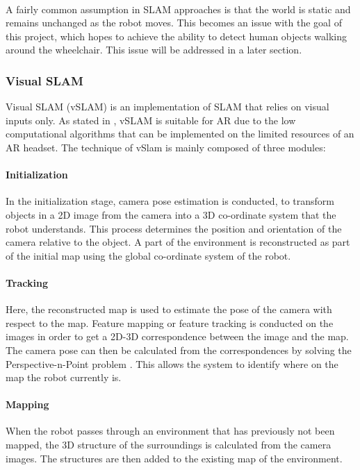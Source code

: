 \paragraph{}A fairly common assumption in SLAM approaches is that the world is static and remains unchanged as the robot moves. This becomes an issue with the goal of this project, which hopes to achieve the ability to detect human objects walking around the wheelchair. This issue will be addressed in a later section.

\subsubsection{Visual SLAM}
Visual SLAM (vSLAM) is an implementation of SLAM that relies on visual inputs only. As stated in \cite{Taketomi2017}, vSLAM is suitable for AR due to the low computational algorithms that can be implemented on the limited resources of an AR headset. The technique of vSlam is mainly composed of three modules:

\paragraph{Initialization}
In the initialization stage, camera pose estimation is conducted, to transform objects in a 2D image from the camera into a 3D co-ordinate system that the robot understands. This process determines the position and orientation of the camera relative to the object. A part of the environment is reconstructed as part of the initial map using the global co-ordinate system of the robot.

\paragraph{Tracking}
Here, the reconstructed map is used to estimate the pose of the camera with respect to the map. Feature mapping or feature tracking is conducted on the images in order to get a 2D-3D correspondence between the image and the map. The camera pose can then be calculated from the correspondences by solving the Perspective-n-Point problem \citep{Nister2004}. This allows the system to identify where on the map the robot currently is.

\paragraph{Mapping}
When the robot passes through an environment that has previously not been mapped, the 3D structure of the surroundings is calculated from the camera images. The structures are then added to the existing map of the environment.

